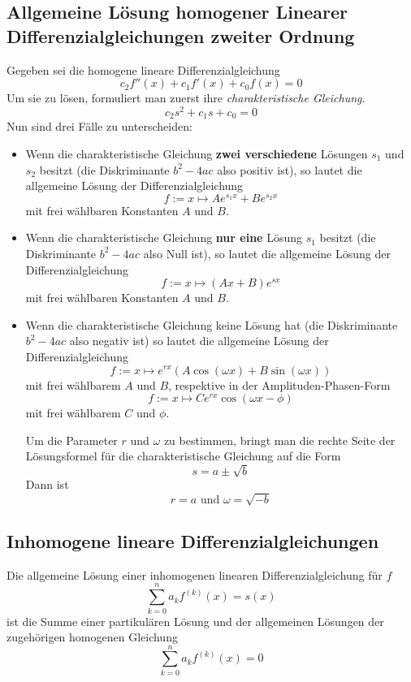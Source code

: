 \documentclass[10pt,a4paper]{scrartcl}
\begin{document}
\subsection{Allgemeine Lösung homogener Linearer Differenzialgleichungen
    zweiter Ordnung}

Gegeben sei die homogene lineare Differenzialgleichung
$$c_2f''(x) + c_1f'(x) + c_0f(x) = 0$$
Um sie zu lösen, formuliert man zuerst ihre \emph{charakteristische Gleichung}.
$$c_2s^2 + c_1s + c_0 = 0$$
Nun sind drei Fälle zu unterscheiden:

\begin{itemize}
    \item Wenn die charakteristische Gleichung \textbf{zwei verschiedene}
        Lösungen $s_1$ und $s_2$ besitzt (die Diskriminante $b^2 - 4ac$ also
        positiv ist), so lautet die allgemeine Lösung der Differenzialgleichung
        $$f := x \mapsto Ae^{s_1 x} + Be^{s_2 x}$$
        mit frei wählbaren Konstanten $A$ und $B$.
    \item Wenn die charakteristische Gleichung \textbf{nur eine} Lösung $s_1$
        besitzt (die Diskriminante $b^2 - 4ac$ also Null ist), so lautet die
        allgemeine Lösung der Differenzialgleichung
        $$f := x \mapsto (Ax + B)e^{sx}$$
        mit frei wählbaren Konstanten $A$ und $B$.
    \item Wenn die charakteristische Gleichung keine Lösung hat (die
        Diskriminante $b^2 - 4ac$ also negativ ist) so lautet die allgemeine
        Lösung der Differenzialgleichung
        $$f := x \mapsto e^{rx}\left(A \cos(\omega x)
            + B \sin(\omega x)\right)$$
        mit frei wählbarem $A$ und $B$, respektive in der Amplituden-Phasen-Form
        $$f := x \mapsto Ce^{rx} \cos(\omega x - \phi)$$
        mit frei wählbarem $C$ und $\phi$.

        Um die Parameter $r$ und $\omega$ zu bestimmen, bringt man die rechte
        Seite der Lösungsformel für die charakteristische Gleichung auf die Form
        $$s = a \pm \sqrt{b}$$
        Dann ist
        $$r = a \textrm{ und } \omega = \sqrt{-b}$$
\end{itemize}


\subsection{Inhomogene lineare Differenzialgleichungen}

Die allgemeine Lösung einer inhomogenen linearen Differenzialgleichung für $f$
$$\sum_{k=0}^n a_k f^{(k)}(x) = s(x)$$
ist die Summe einer partikulären Lösung und der allgemeinen Lösungen der
zugehörigen homogenen Gleichung
$$\sum_{k=0}^n a_k f^{(k)}(x) = 0$$
\end{document}
